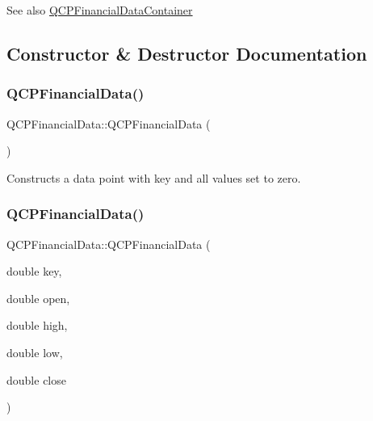 \begin{DoxySeeAlso}{See also}
\hyperlink{qcustomplot_8h_ae36e482e04f19a54782f01ab38c354a6}{Q\+C\+P\+Financial\+Data\+Container} 
\end{DoxySeeAlso}


\subsection{Constructor \& Destructor Documentation}
\mbox{\label{class_q_c_p_financial_data_a1ca53b3a9ae4e9658a4fd1ca57d76ba4}} 
\subsubsection{\texorpdfstring{Q\+C\+P\+Financial\+Data()}{QCPFinancialData()}\hspace{0.1cm}{\footnotesize\ttfamily [1/2]}}
{\footnotesize\ttfamily Q\+C\+P\+Financial\+Data\+::\+Q\+C\+P\+Financial\+Data (\begin{DoxyParamCaption}{ }\end{DoxyParamCaption})}

Constructs a data point with key and all values set to zero. \mbox{\label{class_q_c_p_financial_data_a069b72c514dfd4fc8e1d5df811e54ca4}} 
\subsubsection{\texorpdfstring{Q\+C\+P\+Financial\+Data()}{QCPFinancialData()}\hspace{0.1cm}{\footnotesize\ttfamily [2/2]}}
{\footnotesize\ttfamily Q\+C\+P\+Financial\+Data\+::\+Q\+C\+P\+Financial\+Data (\begin{DoxyParamCaption}\item[{double}]{key,  }\item[{double}]{open,  }\item[{double}]{high,  }\item[{double}]{low,  }\item[{double}]{close }\end{DoxyParamCaption})}

